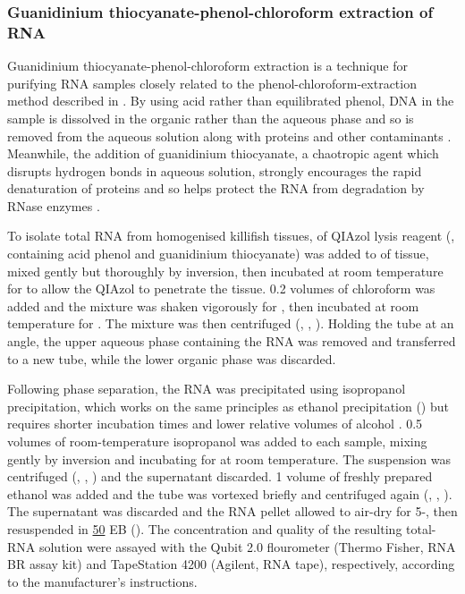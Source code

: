 \subsubsection{Guanidinium thiocyanate-phenol-chloroform extraction of RNA}
\label{sec:methods_molec_standard_qiazol}

Guanidinium thiocyanate-phenol-chloroform extraction is a technique for purifying RNA samples closely related to the phenol-chloroform-extraction method described in  \parencite{zumbo2012phenolchloroform}. By using acid rather than equilibrated phenol, DNA in the sample is dissolved in the organic rather than the aqueous phase and so is removed from the aqueous solution along with proteins and other contaminants \parencite{zumbo2012phenolchloroform,chomczynski2006trizol}. Meanwhile, the addition of guanidinium thiocyanate, a chaotropic agent which disrupts hydrogen bonds in aqueous solution, strongly encourages the rapid denaturation of proteins and so helps protect the RNA from degradation by RNase enzymes \parencite{zumbo2012phenolchloroform,chomczynski2006trizol}.

To isolate total RNA from homogenised killifish tissues,  of QIAzol lysis reagent (, containing acid phenol and guanidinium thiocyanate) was added to  of tissue, mixed gently but thoroughly by inversion, then incubated at room temperature for  to allow the QIAzol to penetrate the tissue. 0.2 volumes of chloroform was added and the mixture was shaken vigorously for , then incubated at room temperature for . The mixture was then centrifuged (, , ). Holding the tube at an angle, the upper aqueous phase containing the RNA was removed and transferred to a new tube, while the lower organic phase was discarded.

Following phase separation, the RNA was precipitated using isopropanol precipitation, which works on the same principles as ethanol precipitation () but requires shorter incubation times and lower relative volumes of alcohol \parencite{zumbo2012ethanol}. 0.5 volumes of room-temperature isopropanol was added to each sample, mixing gently by inversion and incubating for  at room temperature. The suspension was centrifuged (, , ) and the supernatant discarded. 1 volume of freshly prepared  ethanol was added and the tube was vortexed briefly and centrifuged again (, , ). The supernatant was discarded and the RNA pellet allowed to air-dry for 5-, then resuspended in \ul{50} EB (). The concentration and quality of the resulting total-RNA solution were assayed with the Qubit 2.0 flourometer (Thermo Fisher, RNA BR assay kit) and TapeStation 4200 (Agilent, RNA tape), respectively, according to the manufacturer's instructions.

